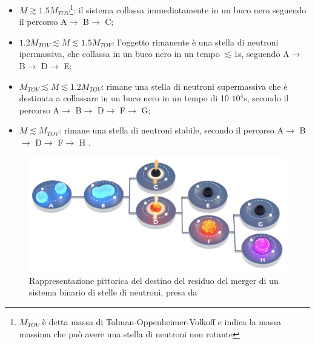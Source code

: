 \begin{itemize}
	\item $M\gtrsim 1.5 M_{TOV}$\footnote{$M_{TOV}$ è detta massa di Tolman-Oppenheimer-Volkoff e indica la massa massima che può avere una stella di neutroni non rotante}: il sistema collassa immediatamente in un buco nero seguendo il percorso A$\rightarrow$ B$\rightarrow$ C;
	\item $1.2 M_{TOV} \lesssim M \lesssim 1.5 M_{TOV}$: l'oggetto rimanente è una stella di neutroni ipermassiva, che collassa in un buco nero in un tempo $\lesssim 1$s, seguendo A$\rightarrow$ B$\rightarrow$ D$\rightarrow$ E;		
	\item $M_{TOV} \lesssim M \lesssim 1.2 M_{TOV}$: rimane una stella di neutroni supermassiva che è destinata a collassare in un buco nero in un tempo di 10 \textdiv $10^4$s, secondo il percorso A$\rightarrow$ B$\rightarrow$ D$\rightarrow$ F$\rightarrow$ G;		\item $M\lesssim M_{TOV}$: rimane una stella di neutroni stabile, secondo il percorso A$\rightarrow$ B$\rightarrow$ D$\rightarrow$ F$\rightarrow$ H \cite{sarin2020evolution}.	
\end{itemize}

\vspace{-20pt}
\begin{figure}
	\includegraphics[scale=0.25]{figures/Capitolo_1/MagnetarEvolution.png}
	\captionsetup{width=0.8\textwidth}
	\caption{Rappresentazione pittorica del destino del residuo del merger di un sistema binario di stelle di neutroni, presa da \cite{sarin2020evolution}}
	\label{fig:EvoluzioneBNS}
	\vspace{-15pt}
\end{figure}

